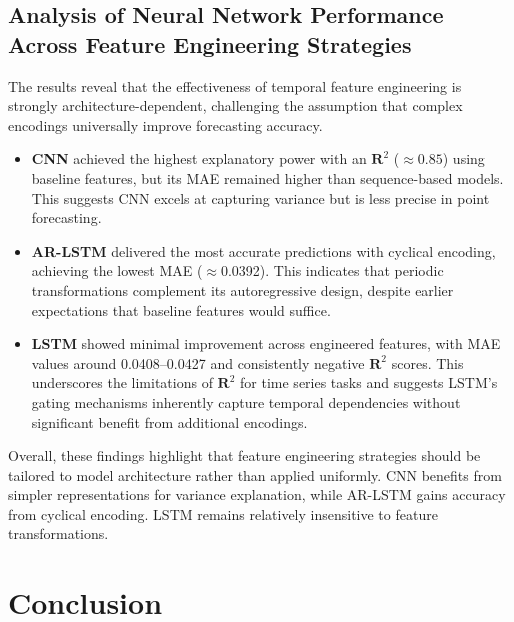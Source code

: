 \documentclass[conference]{IEEEtran}
\begin{document}
	\subsection{Analysis of Neural Network Performance Across Feature Engineering Strategies}
	The results reveal that the effectiveness of temporal feature engineering is strongly architecture-dependent, challenging the assumption that complex encodings universally improve forecasting accuracy.
	\begin{itemize}
		\item \textbf{CNN} achieved the highest explanatory power with an $\mathbf{R}^{2}$ ($\approx0.85$) using baseline features, but its MAE remained higher than sequence-based models. This suggests CNN excels at capturing variance but is less precise in point forecasting.
		\item \textbf{AR-LSTM} delivered the most accurate predictions with cyclical encoding, achieving the lowest MAE ($\approx$0.0392). This indicates that periodic transformations complement its autoregressive design, despite earlier expectations that baseline features would suffice.
		\item \textbf{LSTM} showed minimal improvement across engineered features, with MAE values around 0.0408–0.0427 and consistently negative $\mathbf{R}^{2}$ scores. This underscores the limitations of $\mathbf{R}^{2}$ for time series tasks and suggests LSTM’s gating mechanisms inherently capture temporal dependencies without significant benefit from additional encodings.
	\end{itemize}
	Overall, these findings highlight that feature engineering strategies should be tailored to model architecture rather than applied uniformly. CNN benefits from simpler representations for variance explanation, while AR-LSTM gains accuracy from cyclical encoding. LSTM remains relatively insensitive to feature transformations.
	
	\section{Conclusion}
	
\end{document}
